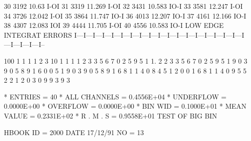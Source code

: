 \begin{Listing}
    30      3192        10.63                                                                      I-OI
    31      3319        11.269                                                                       I-OI
    32      3431        10.583                                                                     IO-I
    33      3581        12.247                                                                          I-OI
    34      3726        12.042                                                                         I-OI
    35      3864        11.747                                                                         IO-I
    36      4013        12.207                                                                          IO-I
    37      4161        12.166                                                                          IO-I
    38      4307        12.083                                                                          IOI
    39      4444        11.705                                                                        I-OI
    40      4556        10.583                                                                     IO-I
  LOW EDGE  INTEGRAT   ERRORS  I---I---I---I---I---I---I---I---I---I---I---I---I---I---I---I---I---I---I---I---I---I---I--
 
                         100                                                                       1   1   1   1   2   3
                          10                               1   1   1   1   2   3   3   5   6   7   0   2   5   9   5   1
                           1.  2   2   3   3   5   6   7   0   2   5   9   5   1   9   0   3   9   0   5   8   9   1   6
                           0   0   5   1   9   0   3   9   0   5   8   9   1   6   8   1   1   4   0   8   4   5   1   2
                           0   0   1   6   8   1   1   4   0   9   5   5   2   2   1   2   0   3   0   9   9   3   9   3
 
 * ENTRIES =         40      * ALL CHANNELS = 0.4556E+04      * UNDERFLOW = 0.0000E+00      * OVERFLOW = 0.0000E+00
 * BIN WID = 0.1000E+01      * MEAN VALUE   = 0.2331E+02      * R . M . S = 0.9558E+01
\newpage
 TEST OF BIG BIN                                                                 
 
 HBOOK     ID =      2000                                        DATE  17/12/91              NO =  13
 

\end{Listing}
